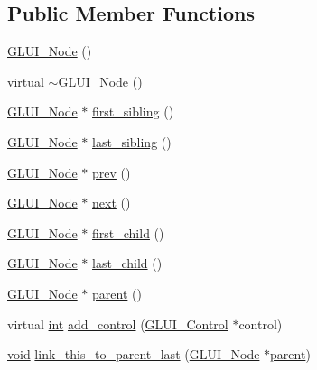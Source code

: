 \subsection*{Public Member Functions}
\begin{DoxyCompactItemize}
\item 
\hyperlink{class_g_l_u_i___node_a066e5d80bfb9925bdb034c29da9c844c}{G\+L\+U\+I\+\_\+\+Node} ()
\item 
virtual \hyperlink{class_g_l_u_i___node_ae6982edc46ab73963ee8ce9f6d035982}{$\sim$\+G\+L\+U\+I\+\_\+\+Node} ()
\item 
\hyperlink{class_g_l_u_i___node}{G\+L\+U\+I\+\_\+\+Node} $\ast$ \hyperlink{class_g_l_u_i___node_ace20232965e8d9da8f3d286113d5572a}{first\+\_\+sibling} ()
\item 
\hyperlink{class_g_l_u_i___node}{G\+L\+U\+I\+\_\+\+Node} $\ast$ \hyperlink{class_g_l_u_i___node_a6458e5a6af00ddf2ebb9271c06fa2931}{last\+\_\+sibling} ()
\item 
\hyperlink{class_g_l_u_i___node}{G\+L\+U\+I\+\_\+\+Node} $\ast$ \hyperlink{class_g_l_u_i___node_a84892bf13144651007640c5f25b51145}{prev} ()
\item 
\hyperlink{class_g_l_u_i___node}{G\+L\+U\+I\+\_\+\+Node} $\ast$ \hyperlink{class_g_l_u_i___node_a7901214f386113b417a25de023476317}{next} ()
\item 
\hyperlink{class_g_l_u_i___node}{G\+L\+U\+I\+\_\+\+Node} $\ast$ \hyperlink{class_g_l_u_i___node_a631b094804b887c0d091ece2786543d1}{first\+\_\+child} ()
\item 
\hyperlink{class_g_l_u_i___node}{G\+L\+U\+I\+\_\+\+Node} $\ast$ \hyperlink{class_g_l_u_i___node_a4825cdc843f0e2b46d75fe5cb9e8ba35}{last\+\_\+child} ()
\item 
\hyperlink{class_g_l_u_i___node}{G\+L\+U\+I\+\_\+\+Node} $\ast$ \hyperlink{class_g_l_u_i___node_a8ed65d447784f6f88bd3e2e2bcac6cdb}{parent} ()
\item 
virtual \hyperlink{wglext_8h_a500a82aecba06f4550f6849b8099ca21}{int} \hyperlink{class_g_l_u_i___node_abdcdd643758adab07580124187565fcd}{add\+\_\+control} (\hyperlink{class_g_l_u_i___control}{G\+L\+U\+I\+\_\+\+Control} $\ast$control)
\item 
\hyperlink{wglext_8h_a9e6b7f1933461ef318bb000d6bd13b83}{void} \hyperlink{class_g_l_u_i___node_a28eb5c7bf5a0edf5b7ba2502384c6544}{link\+\_\+this\+\_\+to\+\_\+parent\+\_\+last} (\hyperlink{class_g_l_u_i___node}{G\+L\+U\+I\+\_\+\+Node} $\ast$\hyperlink{class_g_l_u_i___node_a8ed65d447784f6f88bd3e2e2bcac6cdb}{parent})
\item 

\end{DoxyCompactItemize}
